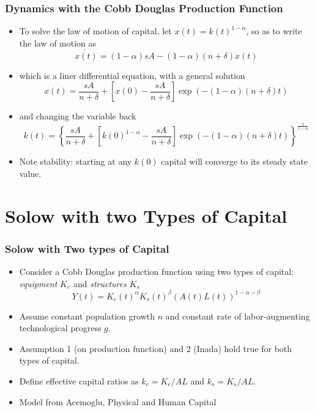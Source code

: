 \documentclass[11pt]{beamer}
\begin{document}
\begin{frame}
\frametitle{Dynamics with the Cobb Douglas Production Function}
\begin{itemize}\itemsep2ex
	\item To solve the law of motion of capital, let $x(t)=k(t)^{1-\alpha}$, so as to write the law of motion as
\begin{equation*}
\dot{x(t)} = (1-\alpha) sA - (1-\alpha) (n+\delta)x(t)
\end{equation*}
	\item which is a liner differential equation, with a general solution
\begin{equation*}
x(t) = \frac{sA}{n+\delta} + \left [x(0) - \frac{sA}{n+\delta}  \right ]  \exp (- (1-\alpha)(n+\delta)t)
\end{equation*}
	\item and changing the variable back
\begin{equation*}
k(t) = \left \{\frac{sA}{n+\delta} + \left [k(0)^{1-\alpha} -  \frac{sA}{n+\delta}  \right ]  \exp (- (1-\alpha)(n+\delta)t) \right \}^{\frac{1}{1-\alpha}}
\end{equation*}
	\item Note stability: starting at any $k(0)$ capital will converge to its steady state value.
\end{itemize}
\end{frame}


\section{Solow with two Types of Capital}




\begin{frame}
\frametitle{Solow with Two types of Capital}
\begin{itemize}\itemsep2ex
	\item Consider a Cobb Douglas production function using two types of capital: \textit{equipment} $K_e$ and \textit{structures} $K_s$
\begin{equation*}
Y(t) = K_e(t)^\alpha K_s(t)^\beta (A(t) L(t))^{1-\alpha-\beta}
\end{equation*}
	\item Assume constant population growth $n$ and constant rate of labor-augmenting technological progress $g$.
	\item Assumption 1 (on production function) and 2 (Inada) hold true for both types of capital.
	\item Define effective capital ratios as $k_e=K_e/AL$ and $k_s=K_s/AL$.
	\item Model from Acemoglu, Physical and Human Capital
\end{itemize}
\end{frame}
\end{document}
